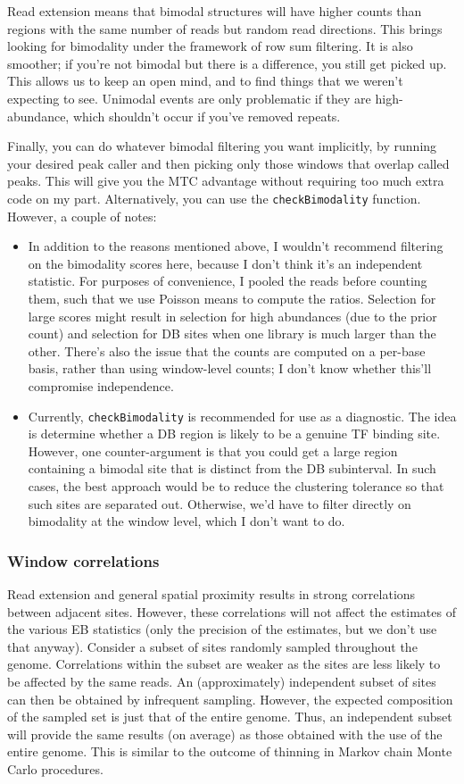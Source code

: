 \documentclass[12pt]{report}
\newcommand{\code}[1]{{\small\texttt{#1}}}
\begin{document}
Read extension means that bimodal structures will have higher counts than regions with the same number of reads but random read directions. 
This brings looking for bimodality under the framework of row sum filtering. 
It is also smoother; if you're not bimodal but there is a difference, you still get picked up.
This allows us to keep an open mind, and to find things that we weren't expecting to see.
Unimodal events are only problematic if they are high-abundance, which shouldn't occur if you've removed repeats.

Finally, you can do whatever bimodal filtering you want implicitly, by running your desired peak caller and then picking only those windows that overlap called peaks. 
This will give you the MTC advantage without requiring too much extra code on my part.
Alternatively, you can use the \code{checkBimodality} function.
However, a couple of notes:
\begin{itemize}
\item In addition to the reasons mentioned above, I wouldn't recommend filtering on the bimodality scores here, because I don't think it's an independent statistic. 
For purposes of convenience, I pooled the reads before counting them, such that we use Poisson means to compute the ratios.
Selection for large scores might result in selection for high abundances (due to the prior count) and selection for DB sites when one library is much larger than the other.
There's also the issue that the counts are computed on a per-base basis, rather than using window-level counts; I don't know whether this'll compromise independence.
\item Currently, \code{checkBimodality} is recommended for use as a diagnostic.
The idea is determine whether a DB region is likely to be a genuine TF binding site.
However, one counter-argument is that you could get a large region containing a bimodal site that is distinct from the DB subinterval.
In such cases, the best approach would be to reduce the clustering tolerance so that such sites are separated out.
Otherwise, we'd have to filter directly on bimodality at the window level, which I don't want to do.
\end{itemize}

\subsubsection*{Window correlations}

Read extension and general spatial proximity results in strong correlations between adjacent sites.
However, these correlations will not affect the estimates of the various EB statistics (only the precision of the estimates, but we don't use that anyway).
Consider a subset of sites randomly sampled throughout the genome. 
Correlations within the subset are weaker as the sites are less likely to be affected by the same reads. 
An (approximately) independent subset of sites can then be obtained by infrequent sampling. 
However, the expected composition of the sampled set is just that of the entire genome.
Thus, an independent subset will provide the same results (on average) as those obtained with the use of the entire genome.  
This is similar to the outcome of thinning in Markov chain Monte Carlo procedures.
\end{document}
